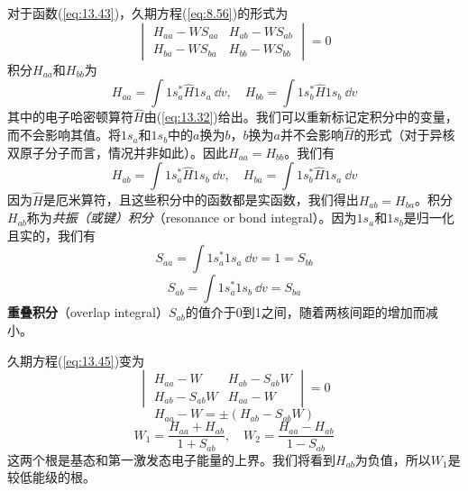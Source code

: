     对于函数(\ref{eq:13.43})，久期方程(\ref{eq:8.56})的形式为
    \begin{equation}
        \begin{vmatrix}
            H_{aa} - WS_{aa} & H_{ab} - WS_{ab} \\
            H_{ba} - WS_{ba} & H_{bb} - WS_{bb}
        \end{vmatrix} = 0
        \label{eq:13.45}
    \end{equation}
    积分$H_{aa}$和$H_{bb}$为
    \begin{equation}
        H_{aa} = \int 1s_a^* \hat{H} 1s_a\:\dd v, \quad H_{bb} = \int 1s_b^* \hat{H} 1s_b\:\dd v
        \label{eq:13.46}
    \end{equation}
    其中的电子哈密顿算符$\hat{H}$由(\ref{eq:13.32})给出。我们可以重新标记定积分中的变量，而不会影响其值。将$1s_a$和$1s_b$中的$a$换为$b$，$b$换为$a$并不会影响$\hat{H}$的形式（对于异核双原子分子而言，情况并非如此）。因此$H_{aa} = H_{bb}$。我们有
    \begin{equation}
        H_{ab} = \int 1s_a^* \hat{H} 1s_b\:\dd v, \quad H_{ba} = \int 1s_b^* \hat{H} 1s_a\:\dd v
        \label{eq:13.47}
    \end{equation}
    因为$\hat{H}$是厄米算符，且这些积分中的函数都是实函数，我们得出$H_{ab} = H_{ba}$。积分$H_{ab}$称为\textit{共振（或键）积分}（resonance or bond integral）。因为$1s_a$和$1s_b$是归一化且实的，我们有
    \begin{equation*}
        S_{aa} = \int 1s_a^* 1s_a\:\dd v = 1 = S_{bb}
    \end{equation*}
    \begin{equation}
        \boxed{
            S_{ab} = \int 1s_a^* 1s_b\:\dd v = S_{ba}
        }
        \label{eq:13.48}
    \end{equation}
    \textbf{重叠积分}（overlap integral）$S_{ab}$的值介于0到1之间，随着两核间距的增加而减小。

    久期方程(\ref{eq:13.45})变为
    \begin{equation}
        \begin{vmatrix}
            H_{aa} - W & H_{ab} - S_{ab}W \\
            H_{ab} - S_{ab}W & H_{aa} - W
        \end{vmatrix} = 0
        \label{eq:13.49}
    \end{equation}
    \begin{equation}
        H_{aa} - W = \pm \left(H_{ab} - S_{ab}W\right)
        \label{eq:13.50}
    \end{equation}
    \begin{equation}
        W_1 = \frac{H_{aa} + H_{ab}}{1 + S_{ab}}, \quad W_2 = \frac{H_{aa} - H_{ab}}{1 - S_{ab}}
        \label{eq:13.51}
    \end{equation}
    这两个根是基态和第一激发态电子能量的上界。我们将看到$H_{ab}$为负值，所以$W_1$是较低能级的根。

